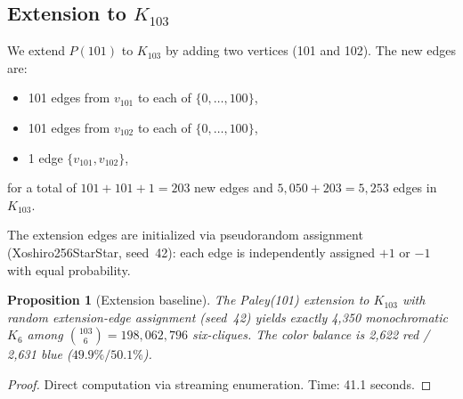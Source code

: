 \documentclass[11pt,a4paper]{article}
\theoremstyle{plain}
\newtheorem{proposition}[theorem]{Proposition}
\theoremstyle{remark}
\begin{document}
\subsection{Extension to $K_{103}$}

We extend $P(101)$ to $K_{103}$ by adding two vertices (101 and 102).
The new edges are:
\begin{itemize}[leftmargin=2em]
  \item 101 edges from $v_{101}$ to each of $\{0, \ldots, 100\}$,
  \item 101 edges from $v_{102}$ to each of $\{0, \ldots, 100\}$,
  \item 1 edge $\{v_{101}, v_{102}\}$,
\end{itemize}
for a total of $101 + 101 + 1 = 203$ new edges and
$5{,}050 + 203 = 5{,}253$ edges in $K_{103}$.

The extension edges are initialized via pseudorandom assignment
(Xoshiro256StarStar, seed~42):
each edge is independently assigned $+1$ or $-1$ with equal probability.

\begin{proposition}[Extension baseline]\label{prop:extension}
The Paley(101) extension to $K_{103}$ with random extension-edge
assignment (seed~42) yields exactly 4{,}350 monochromatic $K_6$
among $\binom{103}{6} = 198{,}062{,}796$ six-cliques.
The color balance is 2{,}622 red / 2{,}631 blue
($49.9\%/50.1\%$).
\end{proposition}

\begin{proof}
Direct computation via streaming enumeration. Time: 41.1 seconds.
\end{proof}
\end{document}

